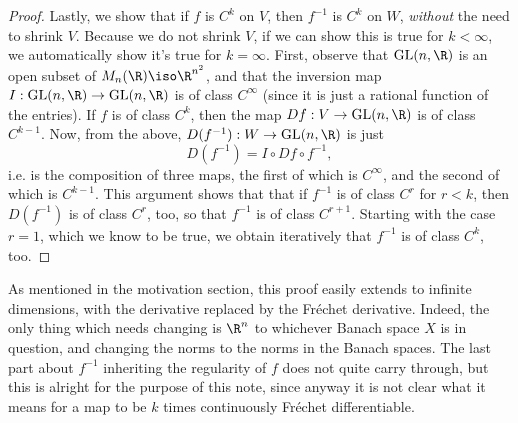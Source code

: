 \documentclass[12pt]{article}
\begin{document}
\begin{proof}
Lastly, we show that if $f$ is $C^k$ on $V$, then $f^{-1}$ is $C^k$ on $W$, \emph{without} the need to shrink $V$. Because we do not shrink $V$, if we can show this is true for $k < \infty$, we automatically show it's true for $k = \infty$. First, observe that $\text{GL}(n,\R)$ is an open subset of $M_n(\R) \iso \R^{n^2}$, and that the inversion map $I:\text{GL}(n,\R)\to \text{GL}(n,\R)$ is of class $C^\infty$ (since it is just a rational function of the entries). If $f$ is of class $C^k$, then the map $Df:V \to  \text{GL}(n,\R)$ is of class $C^{k-1}$. Now, from the above, $D(f^{-1}):W \to \text{GL}(n,\R)$ is just \[D(f^{-1}) = I\circ Df \circ f^{-1},\]
 i.e. is the composition of three maps, the first of which is $C^\infty$, and the second of which is $C^{k-1}$. This argument shows that that if $f^{-1}$ is of class $C^r$ for $r < k$, then $D(f^{-1})$ is of class $C^{r}$, too, so that $f^{-1}$ is of class $C^{r+1}$. Starting with the case $r=1$, which we know to be true, we obtain iteratively that $f^{-1}$ is of class $C^k$, too.
\end{proof}

\begin{rk}As mentioned in the motivation section, this proof easily extends to infinite dimensions, with the derivative replaced by the Fr\'echet derivative. Indeed, the only thing which needs changing is $\R^n$ to whichever Banach space $X$ is in question, and changing the norms to the norms in the Banach spaces. The last part about $f^{-1}$ inheriting the regularity of $f$ does not quite carry through, but this is alright for the purpose of this note, since anyway it is not clear what it means for a map to be $k$ times continuously Fr\'echet differentiable.\end{rk}

\begin{bibdiv}
\begin{biblist}

\newcommand{\perafter}[1]{#1.}



\end{biblist}
\end{bibdiv}
\end{document}
